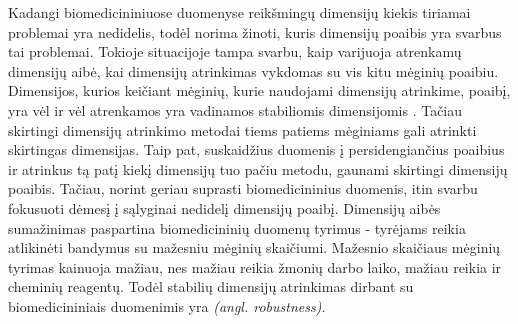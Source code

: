 Kadangi biomedicininiuose duomenyse reikšmingų dimensijų kiekis tiriamai problemai yra nedidelis, todėl norima žinoti, kuris dimensijų poaibis yra svarbus tai problemai. Tokioje situacijoje tampa svarbu, kaip varijuoja atrenkamų dimensijų aibė, kai dimensijų atrinkimas vykdomas su vis kitu mėginių poaibiu. Dimensijos, kurios keičiant mėginių, kurie naudojami dimensijų atrinkime, poaibį, yra vėl ir vėl atrenkamos yra vadinamos stabiliomis dimensijomis \cite{needcitation}. Tačiau skirtingi dimensijų atrinkimo metodai tiems patiems mėginiams gali atrinkti skirtingas dimensijas. Taip pat, suskaidžius duomenis į persidengiančius poaibius ir atrinkus tą patį kiekį dimensijų tuo pačiu metodu, gaunami skirtingi dimensijų poaibis. Tačiau, norint geriau suprasti biomedicininius duomenis, itin svarbu fokusuoti dėmesį į sąlyginai nedidelį dimensijų poaibį. Dimensijų aibės sumažinimas paspartina biomedicininių duomenų tyrimus - tyrėjams reikia atlikinėti bandymus su mažesniu mėginių skaičiumi. Mažesnio skaičiaus mėginių tyrimas kainuoja mažiau, nes mažiau reikia žmonių darbo laiko, mažiau reikia ir cheminių reagentų. Todėl stabilių dimensijų atrinkimas dirbant su biomedicininiais duomenimis yra \textit{(angl. robustness)}.




